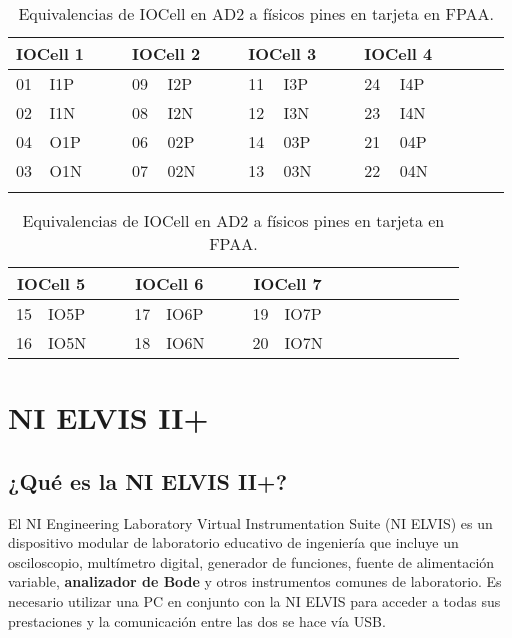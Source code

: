 	\begin{table}[!ht]                                      
		\centering   
		\caption{Equivalencias de IOCell en AD2 a físicos pines en tarjeta en FPAA.}                            
		\label{tab:IOresumen}                                        
			\begin{tabular}{ll cc ll cc ll cc ll cc ll}                        
			\hline                                              
			\multicolumn{2}{c}{IOCell 1} &&& \multicolumn{2}{c}{IOCell 2} &&& \multicolumn{2}{c}{IOCell 3}	&&& \multicolumn{2}{c}{IOCell 4}\\            
			\hline                                              
			01	& I1P	&&&	09	& I2P	&&&	11	& I3P	&&&	24	& I4P	\\  
			02	& I1N	&&&	08	& I2N	&&&	12	& I3N	&&&	23	& I4N	\\
			04	& O1P	&&&	06	& 02P	&&&	14	& 03P	&&&	21	& 04P	\\
			03	& O1N	&&&	07	& 02N	&&&	13	& 03N	&&&	22	& 04N	\\
			\hline
				&&&&&&&&&&&&& 	\\                                 
			\end{tabular}
		
			\begin{tabular}{ll cc ll cc ll cc ll cc ll}                        
			\hline                                              
			\multicolumn{2}{c}{IOCell 5} &&& \multicolumn{2}{c}{IOCell 6} &&& \multicolumn{2}{c}{IOCell 7}	\\            
			\hline                                              
			15	& IO5P	&&&	17	& IO6P	&&&	19	& IO7P	\\  
			16	& IO5N	&&&	18	& IO6N	&&&	20	& IO7N	\\
			\hline                                 
			\end{tabular}                                                             
	\end{table}
	
	\section{NI ELVIS II+}

		\subsection{¿Qué es la NI ELVIS II+?}
	El NI Engineering Laboratory Virtual Instrumentation Suite (NI ELVIS) es un dispositivo modular de laboratorio educativo de ingeniería que incluye un osciloscopio, multímetro digital, generador de funciones, fuente de alimentación variable, \textbf{analizador de Bode} y otros instrumentos comunes de laboratorio. Es necesario utilizar una PC en conjunto con la NI ELVIS para acceder a todas sus prestaciones y la comunicación entre las dos se hace vía USB.

